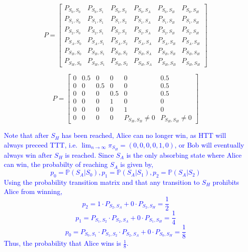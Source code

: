 \documentclass{article}
\begin{document}
    $$P = \begin{bmatrix}
        P_{S_0, S_0} & P_{S_0, S_1} & P_{S_0, S_2} & P_{S_0, S_A} & P_{S_0, S_B} & P_{S_0, S_H}\\
        P_{S_1, S_0} & P_{S_1, S_1} & P_{S_1, S_2} & P_{S_1, S_A} & P_{S_1, S_B} & P_{S_1, S_H}\\
        P_{S_2, S_0} & P_{S_2, S_1} & P_{S_2, S_2} & P_{S_2, S_A} & P_{S_2, S_B} & P_{S_2, S_H}\\
        P_{S_A, S_0} & P_{S_A, S_1} & P_{S_A, S_2} & P_{S_A, S_A} & P_{S_A, S_B} & P_{S_A, S_H}\\
        P_{S_B, S_0} & P_{S_B, S_1} & P_{S_B, S_2} & P_{S_B, S_A} & P_{S_B, S_B} & P_{S_B, S_H}\\
        P_{S_H, S_0} & P_{S_H, S_1} & P_{S_H, S_2} & P_{S_H, S_A} & P_{S_H, S_B} & P_{S_H, S_H}

        
\end{bmatrix}$$

$$P=\begin{bmatrix}
    0 & 0.5 & 0 & 0 & 0 & 0.5 \\
    0 & 0 & 0.5 & 0 & 0 & 0.5 \\ 
    0 & 0 & 0 & 0.5 & 0 & 0.5 \\ 
    0 & 0 & 0 & 1 & 0 & 0 \\
    0 & 0 & 0 & 0 & 1 & 0 \\
    0 & 0 & 0 & 0 & P_{S_H, S_B}\neq 0 & P_{S_H, S_H}\neq 0
\end{bmatrix}$$

\textcolor{blue}{Note that after $S_H$ has been reached, Alice can no longer win, as HTT will always preceed TTT, i.e. $\lim_{n \rightarrow \infty} \pi_{S_H} = (0, 0, 0, 0, 1, 0)$, or Bob will eventually always win after $S_H$ is reached. Since $S_A$ is the only absorbing state where Alice can win, the probabilty of reaching $S_A$ is given by, \\ 
    $$p_0=\mathbb{P}(S_A | S_0), p_1=\mathbb{P}(S_A | S_1), p_2=\mathbb{P}(S_A | S_2)$$
Using the probability transition matrix and that any transition to $S_H$ prohibits Alice from winning, 
$$p_2 = 1 \cdot P_{S_2, S_A} + 0 \cdot P_{S_2, S_H} = \frac{1}{2}$$
$$p_1 = P_{S_1, S_2} \cdot P_{S_2, S_A} + 0 \cdot P_{S_1, S_H} = \frac{1}{4}$$
$$p_0 = P_{S_0, S_1} \cdot P_{S_1, S_2} \cdot P_{S_2, S_A} + 0 \cdot P_{S_0, S_H} = \frac{1}{8}$$
Thus, the probability that Alice wins is $\frac{1}{8}$.}
\end{document}
